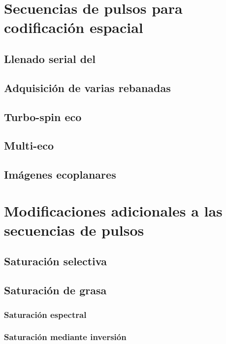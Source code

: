 \section{Secuencias de pulsos para codificación espacial}
\subsection{Llenado serial del \espaciok}

\subsection{Adquisición de varias rebanadas}

\subsection{Turbo-spin eco}

\subsection{Multi-eco}

\subsection{Imágenes ecoplanares}


\section{Modificaciones adicionales a las secuencias de pulsos}
\subsection{Saturación selectiva}
\subsection{Saturación de grasa}
\subsubsection{Saturación espectral}
\subsubsection{Saturación mediante inversión}